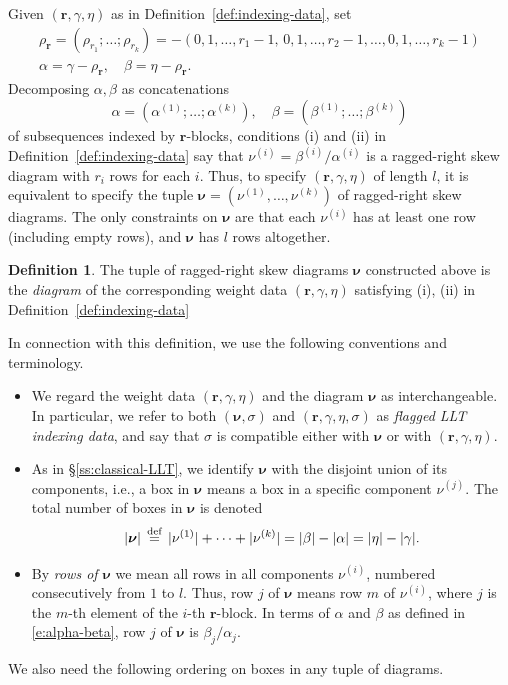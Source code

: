 \documentclass[12pt]{amsart}
\theoremstyle{definition}
\newtheorem{defn}[thm]{Definition}
\theoremstyle{remark}
\newcommand{\rr}{{\mathbf r}}
\newcommand{\nubold}{{\boldsymbol \nu }}
\newcommand{\defeq}{\mathrel{\overset{\text{{\rm def}}}{=}}}
\begin{document}
Given $(\rr ,\gamma ,\eta )$ as in Definition~\ref{def:indexing-data},
set
\begin{gather}\label{e:rho-concat}
\rho _{\rr }  = (\rho _{r_{1}}; \ldots ;\rho _{r_{k}}) = -(0, 1, \ldots,
r_{1}-1,\, 0, 1, \ldots, r_{2}-1, \ldots, 0, 1, \ldots, r_{k}-1)\\
\label{e:alpha-beta}
\alpha = \gamma -\rho _{\rr },\quad \beta = \eta -\rho _{\rr }.
\end{gather}
Decomposing $\alpha ,\beta $ as concatenations
\begin{equation}\label{e:alpha-beta-concat}
\alpha =(\alpha ^{(1)}; \ldots ;\alpha ^{(k)}),\quad \beta =(\beta
^{(1)}; \ldots ;\beta ^{(k)})
\end{equation}
of subsequences indexed by $\rr $-blocks, conditions (i) and (ii) in
Definition~\ref{def:indexing-data} say that $\nu ^{(i)} = \beta
^{(i)}/\alpha ^{(i)}$ is a ragged-right skew diagram with $r_{i}$ rows
for each $i$.  Thus, to specify $(\rr ,\gamma ,\eta )$ of length $l$, it is
equivalent to specify the tuple $\nubold = (\nu ^{(1)},\ldots,\nu
^{(k)})$ of ragged-right skew diagrams.  The only constraints on
$\nubold $ are that each $\nu ^{(i)}$ has at least one row (including
empty rows), and $\nubold $ has $l$ rows altogether.

\begin{defn}\label{def:diagram-and-weights}
The tuple of ragged-right skew diagrams $\nubold $ constructed above
is the {\em diagram} of the corresponding weight data $(\rr, \gamma
,\eta )$ satisfying (i), (ii) in Definition~\ref{def:indexing-data}
\end{defn}

In connection with this definition, we use the following conventions
and terminology.
\begin{itemize}
\item We regard the weight data $(\rr , \gamma ,\eta )$ and the
diagram $\nubold $ as interchangeable.  In particular, we refer to
both $(\nubold ,\sigma )$ and $(\rr , \gamma ,\eta , \sigma )$ as {\em
flagged LLT indexing data}, and say that $\sigma $ is compatible
either with $\nubold $ or with $(\rr , \gamma ,\eta )$.

\item As in \S \ref{ss:classical-LLT}, we identify $\nubold $ with the
disjoint union of its components, i.e., a box in $\nubold $ means a
box in a specific component $\nu ^{(j)}$.  The total number of boxes
in $\nubold $ is denoted
\[
|\nubold | \, \defeq\, |\nu ^{(1)}| +\cdots + |\nu ^{(k)}| = |\beta |
- |\alpha | = |\eta |- |\gamma |.
\]

\item By {\em rows of $\nubold $} we mean all rows in all components
$\nu ^{(i)}$, numbered consecutively from $1$ to $l$.  Thus, row $j$
of $\nubold $ means row $m$ of $\nu ^{(i)}$, where $j$ is the $m$-th
element of the $i$-th $\rr $-block.  In terms of $\alpha $ and $\beta
$ as defined in \eqref{e:alpha-beta}, row $j$ of $\nubold $ is $\beta
_{j}/\alpha _{j}$.
\end{itemize}
We also need the following ordering on boxes in any tuple of diagrams.
\end{document}
